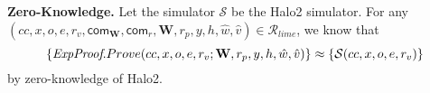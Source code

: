 %
%


\begin{proofs}
\textbf{Zero-Knowledge.} Let the simulator $\mathcal{S}$ be the Halo2 simulator. For any \\
$(cc, x, o, e, r_v, \textsf{com}_\mathbf{W}, \textsf{com}_r, \mathbf{W}, r_p, y, h, \hat{w}, \hat{v}) \in \mathcal{R}_{lime}$, we know that
\[
    \{ \textit{ExpProof}.Prove(cc, x, o, e, r_v; \mathbf{W}, r_p, y, h, \hat{w}, \hat{v}) \} \approx \{ \mathcal{S}(cc, x, o, e, r_v) \}
\]
by zero-knowledge of Halo2.
\end{proofs}

